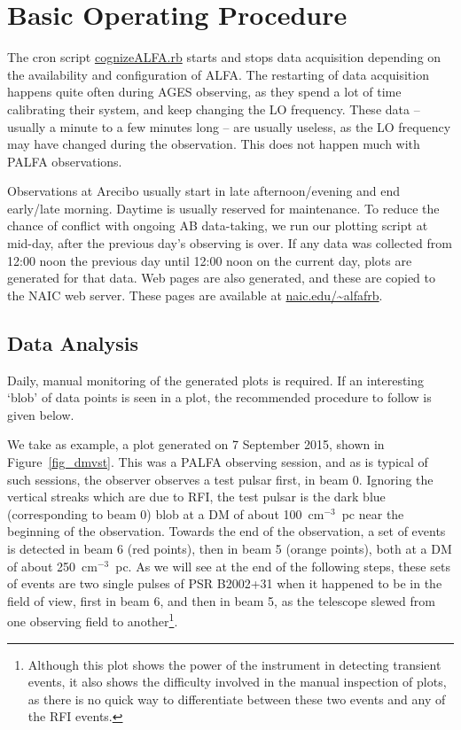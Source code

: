 \documentclass{article}
\begin{document}
\section{Basic Operating Procedure}

The cron script \url{cognizeALFA.rb} starts and stops data acquisition
depending on the availability and configuration of ALFA. The restarting of data
acquisition happens quite often during AGES observing, as they spend a lot of
time calibrating their system, and keep changing the LO frequency. These data
-- usually a minute to a few minutes long -- are usually useless, as the LO
frequency may have changed during the observation. This does not happen much
with PALFA observations.

Observations at Arecibo usually start in late afternoon/evening and end
early/late morning. Daytime is usually reserved for maintenance. To reduce
the chance of conflict with ongoing AB data-taking, we run our plotting script
at mid-day, after the previous day's observing is over. If any data was
collected from 12:00 noon the previous day until 12:00 noon on the current day,
plots are generated for that data. Web pages are also generated, and these are
copied to the NAIC web server. These pages are available at
\url{naic.edu/~alfafrb}.

\subsection{Data Analysis}

Daily, manual monitoring of the generated plots is required. If an interesting
`blob' of data points is seen in a plot, the recommended procedure to follow is
given below.

We take as example, a plot generated on 7 September 2015, shown in
Figure~\ref{fig_dmvst}. This was a PALFA observing session, and as is typical
of such sessions, the observer observes a test pulsar first, in beam 0.
Ignoring the vertical streaks which are due to RFI, the test pulsar is the dark
blue (corresponding to beam 0) blob at a DM of about 100~cm$^{-3}$~pc near the
beginning of the observation. Towards the end of the observation, a set of
events is detected in beam 6 (red points), then in beam 5 (orange points), both
at a DM of about 250~cm$^{-3}$~pc. As we will see at the end of the following
steps, these sets of events are two single pulses of PSR B2002+31 when it
happened to be in the field of view, first in beam 6, and then in beam 5, as
the telescope slewed from one observing field to another\footnote{Although this
plot shows the power of the instrument in detecting transient events, it also
shows the difficulty involved in the manual inspection of plots, as there is no
quick way to differentiate between these two events and any of the RFI
events.}.
\end{document}
